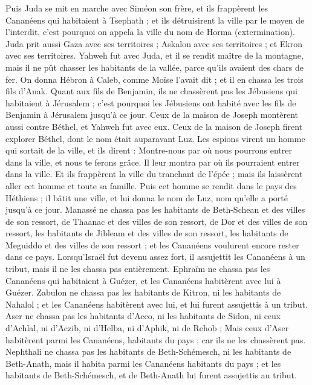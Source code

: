 \begin{multicols}{2}
Puis Juda se mit en marche avec Siméon son frère, et ils frappèrent les Cananéens qui habitaient à Tsephath ; et ils détruisirent la ville par le moyen de l'interdit, c'est pourquoi on appela la ville du nom de Horma (extermination).
Juda prit aussi Gaza avec ses territoires ; Askalon avec ses territoires ; et Ekron avec ses territoires.
Yahweh fut avec Juda, et il se rendit maître de la montagne, mais il ne pût chasser les habitants de la vallée, parce qu'ils avaient des chars de fer.
On donna Hébron à Caleb, comme Moïse l'avait dit ; et il en chassa les trois fils d'Anak.
Quant aux fils de Benjamin, ils ne chassèrent pas les Jébusiens qui habitaient à Jérusalem ; c'est pourquoi les Jébusiens ont habité avec les fils de Benjamin à Jérusalem jusqu'à ce jour.
Ceux de la maison de Joseph montèrent aussi contre Béthel, et Yahweh fut avec eux.
Ceux de la maison de Joseph firent explorer Béthel, dont le nom était auparavant Luz.
Les espions virent un homme qui sortait de la ville,  et ils dirent : Montre-nous par où nous pourrons entrer dans la ville, et nous te ferons grâce.
Il leur montra par où ils pourraient entrer dans la ville. Et ils frappèrent la ville du tranchant de l'épée ; mais ils laissèrent aller cet homme et toute sa famille.
Puis cet homme se rendit dans le pays des Héthiens ; il bâtit une ville, et lui donna le nom de Luz, nom qu’elle a porté jusqu'à ce jour.
Manassé ne chassa pas les habitants de Beth-Schean et des villes de son ressort, de Thaanac et des villes de son ressort, de Dor et des villes de son ressort, les habitants de Jibleam et des villes de son ressort, les habitants de Meguiddo et des villes de son ressort ; et les Cananéens voulurent encore rester dans ce pays.
Lorsqu’Israël fut devenu assez fort, il assujettit les Cananéens à un tribut, mais il ne les chassa pas entièrement.
Ephraïm ne chassa pas les Cananéens qui habitaient à Guézer, et les Cananéens habitèrent avec lui à Guézer.
Zabulon ne chassa pas les habitants de Kitron, ni les habitants de Nahalol ; et les Cananéens habitèrent avec lui, et lui furent assujettis à un tribut.
Aser ne chassa pas les habitants d’Acco, ni les habitants de Sidon, ni ceux d’Achlal, ni d'Aczib, ni d'Helba, ni d'Aphik, ni de Rehob ;
Mais ceux d'Aser habitèrent parmi les Cananéens, habitants du pays ; car ils ne les chassèrent pas.
Nephthali ne chassa pas les habitants de Beth-Schémesch, ni les habitants de Beth-Anath, mais il habita parmi les Cananéens habitants du pays ; et les habitants de Beth-Schémesch, et de Beth-Anath lui furent assujettis au tribut.

\end{multicols}
